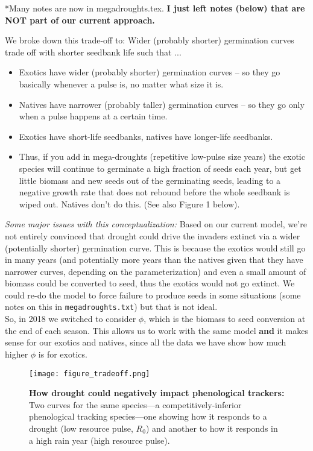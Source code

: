 \documentclass[11pt,a4paper,oneside]{article}
\newenvironment{smitemize}{
\begin{itemize}
  \setlength{\itemsep}{1pt}
  \setlength{\parskip}{0pt}
  \setlength{\parsep}{0pt}}
{\end{itemize}
}
\begin{document}
*Many notes are now in megadroughts.tex. {\bf I just left notes (below) that are NOT part of our current approach.}

\noindent We broke down this trade-off to: Wider (probably shorter) germination curves trade off with shorter seedbank life such that ...
\begin{smitemize}
\item Exotics have wider (probably shorter) germination curves -- so they go basically whenever a pulse is, no matter what size it is.
\item Natives have narrower (probably taller) germination curves -- so they go only when a pulse happens at a certain time.
\item Exotics have short-life seedbanks, natives have longer-life seedbanks. 
\item Thus, if you add in mega-droughts (repetitive low-pulse size years) the exotic species will continue to germinate a high fraction of seeds each year, but get little biomass and new seeds out of the germinating seeds, leading to a negative growth rate that does not rebound before the whole seedbank is wiped out. Natives don't do this. (See also Figure 1 below). 
\end{smitemize}
\emph{Some major issues with this conceptualization:} Based on our current model, we're not entirely convinced that drought could drive the invaders extinct via a wider (potentially shorter) germination curve. This is because the exotics would still go in many years (and potentially more years than the natives given that they have narrower curves, depending on the parameterization) and even a small amount of biomass could be converted to seed, thus the exotics would not go extinct. We could re-do the model to force failure to produce seeds in some situations (some notes on this in \verb|megadroughts.txt|) but that is not ideal. \\

So, in 2018 we switched to consider $\phi$, which is the biomass to seed conversion at the end of each season. This allows us to work with the same model {\bf and} it makes sense for our exotics and natives, since all the data we have show how much higher $\phi$ is for exotics. 

\begin{figure}[h!]
\centering
\noindent \texttt{[image: figure\_tradeoff.png]}
\caption{{\bf How drought could negatively impact phenological trackers:} Two curves for the same species---a competitively-inferior phenological tracking species---one showing how it responds to a drought (low resource pulse, $R_0$) and another to how it responds in a high rain year (high resource pulse).} %
\end{figure}
\end{document}
